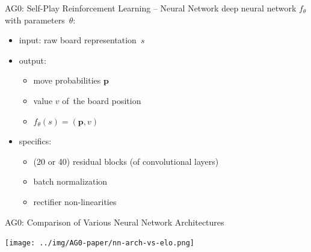 \documentclass{beamer}
\newcommand{\p}{\mathbf{p}}
\begin{document}
{    \begin{frame}{AG0: Self-Play Reinforcement Learning -- Neural Network}
      deep neural network $f_\theta$ with parameters~$\theta$:
      \pause
      \begin{itemize}[<+- | alert@+>]
        \item input: raw board representation~$s$
        \item output:
          \begin{itemize}[<+- | alert@+>]
            \item move probabilities $\p$
            \item value $v$ of~the board position
            \item $f_\theta(s) = (\p, v)$
          \end{itemize}
        \item specifics:
          \begin{itemize}[<+- | alert@+>]
            \item (20 or 40) residual blocks (of convolutional layers)
            \item batch normalization
            \item rectifier non-linearities
          \end{itemize}
      \end{itemize}
    \end{frame}

    \begin{frame}{AG0: Comparison of Various Neural Network Architectures}
      \begin{center}
        \texttt{[image: ../img/AG0-paper/nn-arch-vs-elo.png]}
      \end{center}
    \end{frame}

}
\end{document}
